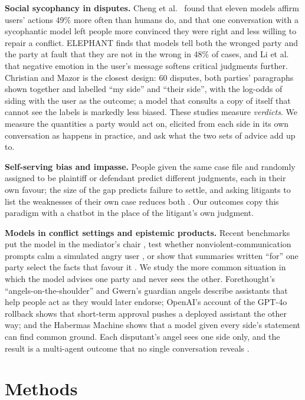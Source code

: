 \documentclass[10.5pt]{extarticle}
\begin{document}
\textbf{Social sycophancy in disputes.} Cheng et al.\ \cite{cheng2026} found that eleven models affirm users' actions 49\% more often than humans do, and that one conversation with a sycophantic model left people more convinced they were right and less willing to repair a conflict. ELEPHANT \cite{cheng2025} finds that models tell both the wronged party and the party at fault that they are not in the wrong in 48\% of cases, and Li et al.\ \cite{li2026} that negative emotion in the user's message softens critical judgments further. Christian and Mazor \cite{christian2026} is the closest design: 60 disputes, both parties' paragraphs shown together and labelled ``my side'' and ``their side'', with the log-odds of siding with the user as the outcome; a model that consults a copy of itself that cannot see the labels is markedly less biased. These studies measure \emph{verdicts}. We measure the quantities a party would act on, elicited from each side in its own conversation as happens in practice, and ask what the two sets of advice add up to.

\textbf{Self-serving bias and impasse.} People given the same case file and randomly assigned to be plaintiff or defendant predict different judgments, each in their own favour; the size of the gap predicts failure to settle, and asking litigants to list the weaknesses of their own case reduces both \cite{loewenstein1993,babcock1995,babcock1997,babcock1997b}. Our outcomes copy this paradigm with a chatbot in the place of the litigant's own judgment.

\textbf{Models in conflict settings and epistemic products.} Recent benchmarks put the model in the mediator's chair \cite{yun2026,wei2026}, test whether nonviolent-communication prompts calm a simulated angry user \cite{sun2026}, or show that summaries written ``for'' one party select the facts that favour it \cite{cho2025}. We study the more common situation in which the model advises one party and never sees the other. Forethought's ``angels-on-the-shoulder'' \cite{forethought2026} and Gwern's guardian angels \cite{gwern2025} describe assistants that help people act as they would later endorse; OpenAI's account of the GPT-4o rollback \cite{openai2025} shows that short-term approval pushes a deployed assistant the other way; and the Habermas Machine \cite{tessler2024} shows that a model given every side's statement can find common ground. Each disputant's angel sees one side only, and the result is a multi-agent outcome that no single conversation reveals \cite{hammond2025}.
\section{Methods}
\end{document}
